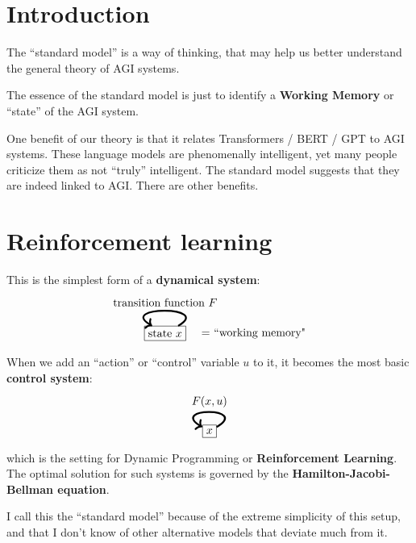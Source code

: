 
\setcounter{section}{-1}
\section{Introduction}

The ``standard model'' is a way of thinking, that may help us better understand the general theory of AGI systems.

The essence of the standard model is just to identify a \textbf{Working Memory} or ``state'' of the AGI system.

One benefit of our theory is that it relates Transformers / BERT / GPT to AGI systems.  These language models are phenomenally intelligent, yet many people criticize them as not ``truly'' intelligent.  The standard model suggests that they are indeed linked to AGI.  There are other benefits.

\section{Reinforcement learning}

This is the simplest form of a \textbf{dynamical system}:
\begin{equation}
\begin{tikzpicture}[->]
\node[rectangle,draw,label=0:{{$\quad =$} ``working memory"}] (C) {state $x$};
\path (C) edge [out=30,in=150,looseness=4,ultra thick] node [above] {transition function $F$} (C);
\end{tikzpicture}
\end{equation}
When we add an ``action'' or ``control'' variable $u$ to it, it becomes the most basic  \textbf{control system}:
\begin{equation}
\begin{tikzpicture}[->]
\node[rectangle,draw] (C) {$x$};
\path (C) edge [out=30,in=150,looseness=7,ultra thick] node [above] {$F(x, u)$} (C);
\end{tikzpicture}
\end{equation}
which is the setting for Dynamic Programming or \textbf{Reinforcement Learning}.  The optimal solution for such systems is governed by the \textbf{Hamilton-Jacobi-Bellman equation}.

I call this the ``standard model'' because of the extreme simplicity of this setup, and that I don't know of other alternative models that deviate much from it.

